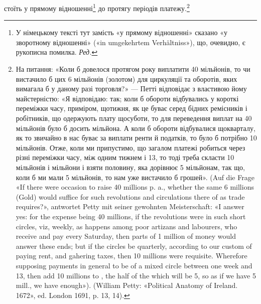 стоїть у прямому відношенні\footnote*{
У німецькому тексті тут замість «у прямому відношенні» сказано
«у зворотному відношенні» («in umgekehrtem Verhältniss»), що, очевидно,
є рукописна помилка. \emph{Ред.}
} до протягу періодів платежу.\footnote{
На питання: «Коли б довелося протягом року виплатити 40 мільйонів,
то чи вистачило б цих 6 мільйонів (золотом) для циркуляції та оборотів,
яких вимагала б у даному разі торговля?» — Петті відповідає з
властивою йому майстерністю: «Я відповідаю: так; коли б обороти відбувались
у короткі переміжки часу, приміром, щотижня, як це буває
серед бідних ремісників і робітників, що одержують плату щосуботи, то
для переведення виплат на 40 мільйонів було б досить  мільйона.
А коли б обороти відбувалися щокварталу, як то звичайно в нас буває
за виплати ренти й податків, то було б потрібно 10 мільйонів. Отже, коли
ми припустимо, що загалом платежі робиться через різні переміжки часу,
між одним тижнем і 13, то тоді треба скласти 10 мільйонів і  мільйони
і взяти половину, яка дорівнює 5 мільйонам, так що, коли б ми мали
5 мільйонів, то нам уже вистачило б грошей». (Auf die Frage «If there were
occasion to raise 40 millions p. a., whether the same 6 millions (Gold) would
suffice for such revolutions and circulations there of as trade requires?», antwortet
Petty mit seiner gewohnten Meisterschaft: «I answer yes: for the expense
being 40 millions, if the revolutions were in such short circles, viz, weekly,
as happens among poor artizans and labourers, who receive and pay every
Saturday, then  parts of 1 million of money would answer these ends;
but if the circles be quarterly, according to our custom of paying rent, and
gahering taxes, then 10 millions were requisite. Wherefore supposing payments
in general to be of a mixed circle between one week and 13, then add
10 millions to , the half of the which will be 5, so as if we have
5 mill., we have enough»). (William Petty: «Political Anatomy of Ireland.
1672», ed. London 1691, p. 13, 14).
}

